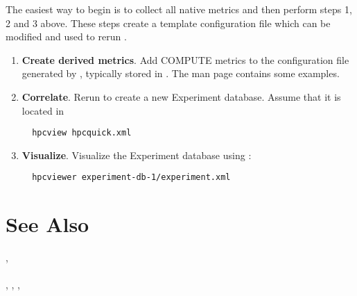 \documentclass[english]{article}
\begin{document}
The easiest way to begin is to collect all native metrics and then perform steps 1, 2 and 3 above.
These steps create a template  configuration file which can be modified and used to rerun .

\begin{enumerate}
\item \textbf{Create derived metrics}.  Add COMPUTE metrics to the  configuration file generated by , typically stored in .  The  man page contains some examples. 

\item \textbf{Correlate}. Rerun  to create a new Experiment database.  Assume that it is located in 
\begin{verbatim}
  hpcview hpcquick.xml
\end{verbatim}

\item \textbf{Visualize}.
Visualize the Experiment database using :
\begin{verbatim}
  hpcviewer experiment-db-1/experiment.xml
\end{verbatim}

\end{enumerate}



\section{See Also}

,  \\
 \\
, , ,  \\ %
\end{document}
